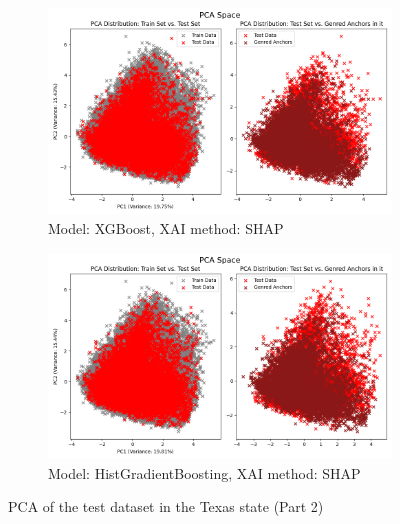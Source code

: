 \begin{figure}[h]
    \ContinuedFloat
    \begin{subfigure}[b]{0.9\textwidth}
        \includegraphics[width=\textwidth]{Images/pca/pca_xg_tx_shap.png}
        \caption{Model: XGBoost, XAI method: SHAP}
        \label{fig:pca_xg_tx_shap}
    \end{subfigure}
    \hfill
    \begin{subfigure}[b]{0.9\textwidth}
        \includegraphics[width=\textwidth]{Images/pca/pca_skrub_tx_shap.png}
        \caption{Model: HistGradientBoosting, XAI method: SHAP}
        \label{fig:pca_skrub_tx_shap}
    \end{subfigure}
    \caption{PCA of the test dataset in the Texas state (Part 2)}
    \label{fig:pca_tx}
\end{figure}
